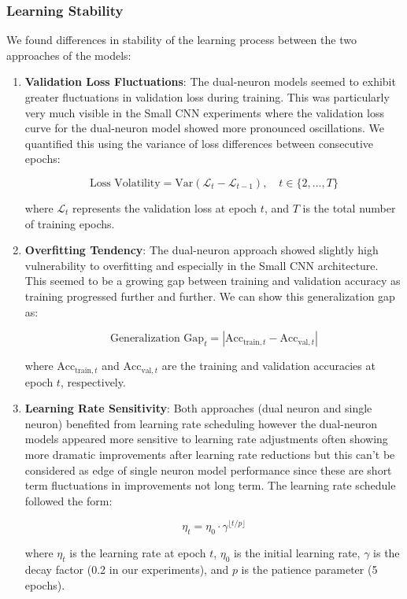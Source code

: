 \subsubsection{Learning Stability}

We found differences in stability of the learning process between the two approaches of the models:

\begin{enumerate}
\item \textbf{Validation Loss Fluctuations}: The dual-neuron models seemed to exhibit greater fluctuations in validation loss during training. This was particularly very much visible in the Small CNN experiments where the validation loss curve for the dual-neuron model showed more pronounced oscillations. We quantified this using the variance of loss differences between consecutive epochs:

\begin{equation}
\text{Loss Volatility} = \text{Var}(\mathcal{L}_t - \mathcal{L}_{t-1}), \quad t \in \{2,...,T\}
\end{equation}

where $\mathcal{L}_t$ represents the validation loss at epoch $t$, and $T$ is the total number of training epochs.

\item \textbf{Overfitting Tendency}: The dual-neuron approach showed slightly high vulnerability to overfitting and especially in the Small CNN architecture. This seemed to be a growing gap between training and validation accuracy as training progressed further and further. We can show this generalization gap as:

\begin{equation}
\text{Generalization Gap}_t = |\text{Acc}_{\text{train},t} - \text{Acc}_{\text{val},t}|
\end{equation}

where $\text{Acc}_{\text{train},t}$ and $\text{Acc}_{\text{val},t}$ are the training and validation accuracies at epoch $t$, respectively.

\item \textbf{Learning Rate Sensitivity}: Both approaches (dual neuron and single neuron) benefited from learning rate scheduling however the dual-neuron models appeared more sensitive to learning rate adjustments often showing more dramatic improvements after learning rate reductions but this can't be considered as edge of single neuron model performance since these are short term fluctuations in improvements not long term. The learning rate schedule followed the form:

\begin{equation}
\eta_t = \eta_0 \cdot \gamma^{\lfloor t/p \rfloor}
\end{equation}

where $\eta_t$ is the learning rate at epoch $t$, $\eta_0$ is the initial learning rate, $\gamma$ is the decay factor (0.2 in our experiments), and $p$ is the patience parameter (5 epochs).
\end{enumerate}

